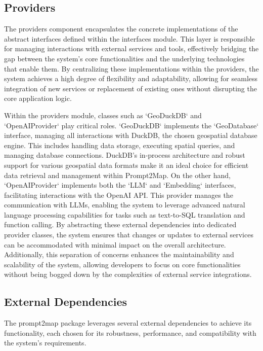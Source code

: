 \subsection{Providers}
The providers component encapsulates the concrete implementations of the abstract interfaces defined within the interfaces module. This layer is responsible for managing interactions with external services and tools, effectively bridging the gap between the system's core functionalities and the underlying technologies that enable them. By centralizing these implementations within the providers, the system achieves a high degree of flexibility and adaptability, allowing for seamless integration of new services or replacement of existing ones without disrupting the core application logic.

Within the providers module, classes such as `GeoDuckDB` and `OpenAIProvider` play critical roles. `GeoDuckDB` implements the `GeoDatabase` interface, managing all interactions with DuckDB, the chosen geospatial database engine. This includes handling data storage, executing spatial queries, and managing database connections. DuckDB's in-process architecture and robust support for various geospatial data formats make it an ideal choice for efficient data retrieval and management within Prompt2Map. On the other hand, `OpenAIProvider` implements both the `LLM` and `Embedding` interfaces, facilitating interactions with the OpenAI API. This provider manages the communication with LLMs, enabling the system to leverage advanced natural language processing capabilities for tasks such as text-to-SQL translation and function calling. By abstracting these external dependencies into dedicated provider classes, the system ensures that changes or updates to external services can be accommodated with minimal impact on the overall architecture. Additionally, this separation of concerns enhances the maintainability and scalability of the system, allowing developers to focus on core functionalities without being bogged down by the complexities of external service integrations.

\subsection{External Dependencies}
The prompt2map package leverages several external dependencies to achieve its functionality, each chosen for its robustness, performance, and compatibility with the system's requirements.

